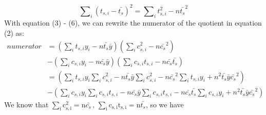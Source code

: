 \begin{appendices}
\begin{equation}\label{eq7}
\sum\nolimits_i \left( t_{s,i}-\bar{t_{s}} \right)^{2} =\sum\nolimits_i t_{s,i}^{2} -n\bar{t_{s}}^{2}
\end{equation}
With equation (3) - (6), we can rewrite the numerator of the quotient in
equation (2) as:
\begin{equation}\label{eq8}
\begin{aligned}
numerator&=\left( \sum\nolimits_i {t_{s,i}y_{i}} -n\bar{t_{s}}\bar{y} \right)\left( \sum\nolimits_i c_{s,i}^{2} -n\bar{c_{s}}^{2} \right)\\
&-\left( \sum\nolimits_i {c_{s,i}y_{i}} -n\bar{c_{s}}\bar{y} \right)\left( \sum\nolimits_i {c_{s,i}t_{s,i}} -n\bar{c_{s}}\bar{t_{s}} \right)\\
&=\left( \sum\nolimits_i {t_{s,i}y_{i}} \sum\nolimits_i c_{s,i}^{2} -n\bar{t_{s}}\bar{y}\sum\nolimits_i c_{s,i}^{2} -n\bar{c_{s}}^{2}\sum\nolimits_i {t_{s,i}y_{i}}
+n^{2}\bar{t_{s}}\bar{y}\bar{c_{s}}^{2} \right)\\
&-\left( \sum\nolimits_i {c_{s,i}y_{i}} \sum\nolimits_i {c_{s,i}t_{s,i}} -n\bar{c_{s}}\bar{y}\sum\nolimits_i {c_{s,i}t_{s,i}} -n\bar{c_{s}}\bar{t_{s}}\sum\nolimits_i {c_{s,i}y_{i}} +n^{2}\bar{t_{s}}\bar{y}\bar{c_{s}}^{2} \right)
\end{aligned}
\end{equation}
We know that $\sum\nolimits_\mathrm{i}\mathrm{c}_{\mathrm{s,i}}^{\mathrm{2}} \mathrm{=n}\bar{c_{s}}\mathrm{\, ,\,}\sum\nolimits_\mathrm{i}{\mathrm{c}_{\mathrm{s,i}}\mathrm{t}_{\mathrm{s,i}}}\mathrm{=n}\bar{t_{s}}$, so we have


\end{appendices}

